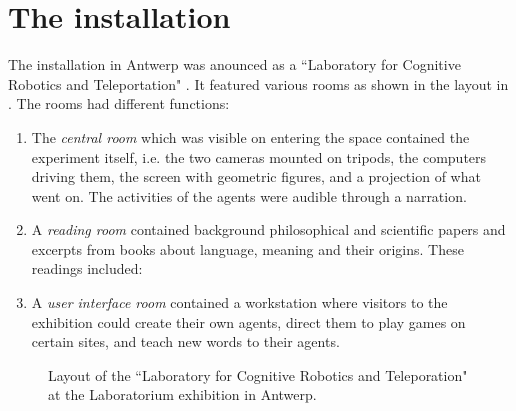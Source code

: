 \section{The installation}

The installation in Antwerp was anounced as a ``Laboratory for Cognitive Robotics and Teleportation" \citep{Steels:99b}.
It featured various rooms as shown in the layout in . The rooms had different functions: 
\begin{enumerate} 
\item The {\itshape central room} which was visible on entering the space contained the experiment itself, i.e. the 
two cameras mounted on tripods, the computers driving them, the screen with geometric figures, and a projection of 
what went on. The activities of the agents were audible through a narration. 
\clearpage
\item A {\itshape reading room} contained background philosophical and scientific 
papers and excerpts from books about language, meaning and their origins. These readings included: 
\item A {\itshape user interface room} contained a workstation where visitors to the exhibition could create their own 
agents, direct them to play games on certain sites, and teach new words to their agents. 
\end{enumerate}

\begin{figure}[bp]
  \centerline{}
\caption{\label{fig:layout}Layout of the ``Laboratory for Cognitive Robotics and Teleporation" at the Laboratorium exhibition in Antwerp.}
\end{figure}


